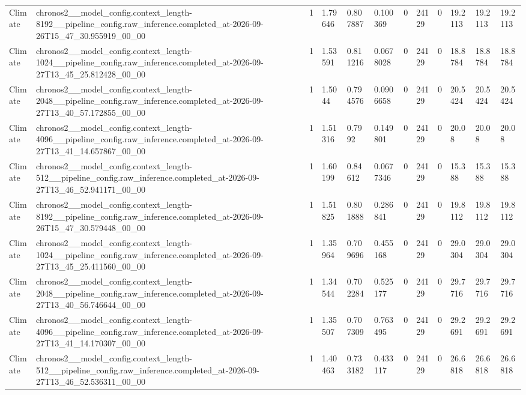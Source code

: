 \begin{tabular}{llllllllllll}
Climate & chronos2\_\_model\_config.context\_length-8192\_\_pipeline\_config.raw\_inference.completed\_at-2026-09-26T15\_47\_30.955919\_00\_00 & 1 & 1.79646 & 0.807887 & 0.100369 & 0 & 24129 & 0 & 19.2113 & 19.2113 & 19.2113 \\
Climate & chronos2\_\_model\_config.context\_length-1024\_\_pipeline\_config.raw\_inference.completed\_at-2026-09-27T13\_45\_25.812428\_00\_00 & 1 & 1.53591 & 0.811216 & 0.0678028 & 0 & 24129 & 0 & 18.8784 & 18.8784 & 18.8784 \\
Climate & chronos2\_\_model\_config.context\_length-2048\_\_pipeline\_config.raw\_inference.completed\_at-2026-09-27T13\_40\_57.172855\_00\_00 & 1 & 1.5044 & 0.794576 & 0.0906658 & 0 & 24129 & 0 & 20.5424 & 20.5424 & 20.5424 \\
Climate & chronos2\_\_model\_config.context\_length-4096\_\_pipeline\_config.raw\_inference.completed\_at-2026-09-27T13\_41\_14.657867\_00\_00 & 1 & 1.51316 & 0.7992 & 0.149801 & 0 & 24129 & 0 & 20.08 & 20.08 & 20.08 \\
Climate & chronos2\_\_model\_config.context\_length-512\_\_pipeline\_config.raw\_inference.completed\_at-2026-09-27T13\_46\_52.941171\_00\_00 & 1 & 1.60199 & 0.84612 & 0.0677346 & 0 & 24129 & 0 & 15.388 & 15.388 & 15.388 \\
Climate & chronos2\_\_model\_config.context\_length-8192\_\_pipeline\_config.raw\_inference.completed\_at-2026-09-26T15\_47\_30.579448\_00\_00 & 1 & 1.51825 & 0.801888 & 0.286841 & 0 & 24129 & 0 & 19.8112 & 19.8112 & 19.8112 \\
Climate & chronos2\_\_model\_config.context\_length-1024\_\_pipeline\_config.raw\_inference.completed\_at-2026-09-27T13\_45\_25.411560\_00\_00 & 1 & 1.35964 & 0.709696 & 0.455168 & 0 & 24129 & 0 & 29.0304 & 29.0304 & 29.0304 \\
Climate & chronos2\_\_model\_config.context\_length-2048\_\_pipeline\_config.raw\_inference.completed\_at-2026-09-27T13\_40\_56.746644\_00\_00 & 1 & 1.34544 & 0.702284 & 0.525177 & 0 & 24129 & 0 & 29.7716 & 29.7716 & 29.7716 \\
Climate & chronos2\_\_model\_config.context\_length-4096\_\_pipeline\_config.raw\_inference.completed\_at-2026-09-27T13\_41\_14.170307\_00\_00 & 1 & 1.35507 & 0.707309 & 0.763495 & 0 & 24129 & 0 & 29.2691 & 29.2691 & 29.2691 \\
Climate & chronos2\_\_model\_config.context\_length-512\_\_pipeline\_config.raw\_inference.completed\_at-2026-09-27T13\_46\_52.536311\_00\_00 & 1 & 1.40463 & 0.733182 & 0.433117 & 0 & 24129 & 0 & 26.6818 & 26.6818 & 26.6818 \\

\end{tabular}
